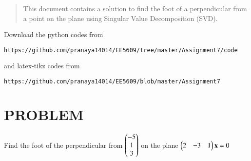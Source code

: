 \documentclass[journal,12pt,twocolumn]{IEEEtran}
\begin{document}
%
\begin{abstract}
This document contains a solution to find the foot of a perpendicular from a point on the plane using Singular Value Decomposition (SVD).
\end{abstract}
Download the python codes from 
%
\begin{lstlisting}
https://github.com/pranaya14014/EE5609/tree/master/Assignment7/code
\end{lstlisting}
%
and latex-tikz codes from 
%
\begin{lstlisting}
https://github.com/pranaya14014/EE5609/blob/master/Assignment7
\end{lstlisting}
%
\section{PROBLEM}
Find the foot of the perpendicular from $\begin{pmatrix}-5\\1\\3\end{pmatrix}$ on the plane $\begin{pmatrix}2&-3&1\end{pmatrix}\mathbf{x}=0$
\end{document}
